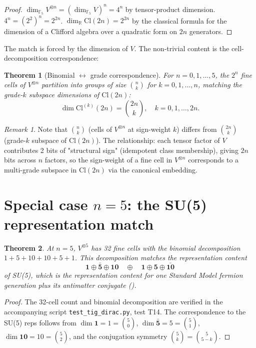\documentclass[11pt,reqno]{amsart}
\theoremstyle{plain}
\newtheorem{theorem}{Theorem}[section]
\theoremstyle{definition}
\theoremstyle{remark}
\newtheorem*{remark}{Remark}
\newcommand{\F}{\mathbb{F}}
\newcommand{\R}{\mathbb{R}}
\newcommand{\Cl}{\mathrm{Cl}}
\begin{document}
\begin{proof}
$\dim_{\F_5} V^{\otimes n} = (\dim_{\F_5} V)^n = 4^n$ by tensor-product
dimension. $4^n = (2^2)^n = 2^{2n}$. $\dim_\R \Cl(2n) = 2^{2n}$ by the
classical formula for the dimension of a Clifford algebra over a
quadratic form on $2n$ generators.
\end{proof}

The match is forced by the dimension of $V$. The non-trivial content is
the cell-decomposition correspondence:

\begin{theorem}[Binomial $\leftrightarrow$ grade correspondence]\label{thm:binomial}
For $n = 0, 1, \ldots, 5$, the $2^n$ fine cells of $V^{\otimes n}$
partition into groups of size $\binom{n}{k}$ for $k = 0, 1, \ldots, n$,
matching the grade-$k$ subspace dimensions of $\Cl(2n)$:
\[
\dim \Cl^{(k)}(2n) = \binom{2n}{k}, \quad k = 0, 1, \ldots, 2n.
\]
\end{theorem}

\begin{remark}
Note that $\binom{n}{k}$ (cells of $V^{\otimes n}$ at sign-weight $k$)
differs from $\binom{2n}{k}$ (grade-$k$ subspace of $\Cl(2n)$). The
relationship: each tensor factor of $V$ contributes 2 bits of "structural
sign" (idempotent class membership), giving $2n$ bits across $n$ factors,
so the sign-weight of a fine cell in $V^{\otimes n}$ corresponds to a
multi-grade subspace in $\Cl(2n)$ via the canonical embedding.
\end{remark}

\section{Special case $n = 5$: the SU(5) representation match}

\begin{theorem}\label{thm:su5}
At $n = 5$, $V^{\otimes 5}$ has 32 fine cells with the binomial
decomposition $1 + 5 + 10 + 10 + 5 + 1$. This decomposition matches the
representation content
\[
\mathbf{1} \oplus \bar{\mathbf{5}} \oplus \mathbf{10}
\quad \oplus \quad
\mathbf{1} \oplus \mathbf{5} \oplus \bar{\mathbf{10}}
\]
of SU(5), which is the representation content for one Standard Model
fermion generation plus its antimatter conjugate
(\cite{GeorgiGlashow1974}).
\end{theorem}

\begin{proof}
The 32-cell count and binomial decomposition are verified in the
accompanying script \texttt{test\_tig\_dirac.py}, test T14. The
correspondence to the SU(5) reps follows from
$\dim \mathbf{1} = 1 = \binom{5}{0}$, $\dim \bar{\mathbf{5}} = 5 = \binom{5}{1}$,
$\dim \mathbf{10} = 10 = \binom{5}{2}$, and the conjugation symmetry
$\binom{5}{k} = \binom{5}{5-k}$.
\end{proof}
\end{document}
